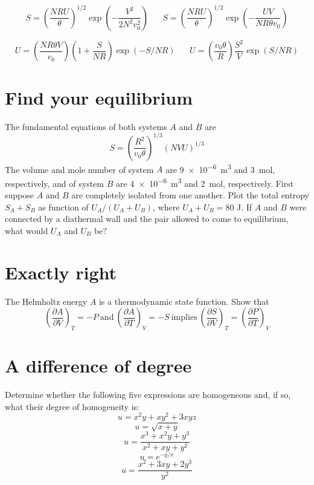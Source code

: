 \documentclass[11pt]{article}
\begin{document}
\[ S = \left ( \frac{NRU}{\theta} \right )^{1/2}\exp
\left (-\frac{V^2}{2N^2v_0^2}
 \right )
\hspace{20pt}
S = \left ( \frac{NRU}{\theta} \right )^{1/2}\exp
\left (-\frac{UV}{NR\theta v_0} \right ) \]

\[ U = \left ( \frac{NR\theta V}{v_0} \right ) \left ( 1+\frac{S}{NR} \right ) \exp
  \left (-S/NR \right )
\hspace{20pt}
U = \left ( \frac{v_0\theta}{R} \right ) \frac{S^2}{V} \exp\left ( S/NR \right )
 \]

\section{Find your equilibrium}
\label{sec:orgc31ab60}
The fundamental equations of both systems \(A\) and \(B\) are \[ S = \left (
\frac{R^2}{v_0\theta} \right )^{1/3} \left ( N V U \right )^{1/3} \] The volume
and mole number of system \(A\) are \SI{9e-6}{m^3} and \SI{3}{\mole},
respectively, and of system \(B\) are \SI{4e-6}{m^3} and \SI{2}{\mole},
respectively.  First suppose \(A\) and \(B\) are completely isolated from one
another.  Plot the total entropy \(S_A + S_B\) as function of \(U_A/(U_A + U_B)\),
where \(U_A + U_B = 80\) J. If \(A\) and \(B\) were connected by a diathermal wall and
the pair allowed to come to equilibrium, what would \(U_A\) and \(U_B\) be?

\section{Exactly right}
\label{sec:orgd8f6b9f}
The Helmholtz energy \(A\) is a thermodynamic state function.  Show that
\[ \left (\frac{\partial A}{\partial V}\right )_T = - P \ \text{and}\ \left
  (\frac{\partial A}{\partial T}\right )_V = - S\ \text{implies}\
 \left (\frac{\partial S}{\partial V}\right )_T = \left
  (\frac{\partial P}{\partial T}\right )_V  \]

\section{A difference of degree}
\label{sec:org5232f23}
Determine whether the following five expressions are homogeneous and, if so, what
  their degree of homogeneity is:
\[ u=x^2y + xy^2 +3xyz \]
\[ u=\sqrt{x+y} \]
\[u=\frac{x^3+x^2y+y^3}{x^2+xy+y^2}\]
\[u=e^{-y/x} \]
\[u=\frac{x^2+3xy+2y^3}{y^2} \]
\end{document}
